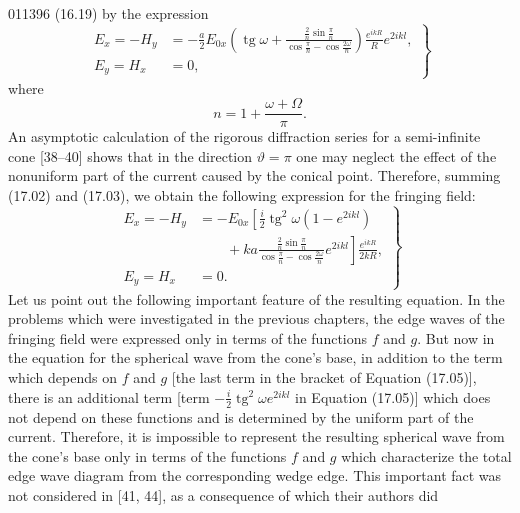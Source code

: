 \begin{scanpage}{0113}{96}
(16.19) by the expression
\[\left.\begin{aligned}E_x=-H_y&=-\frac a2E_{0x}\left(\operatorname{tg}\omega+\frac{\frac2n\sin\frac\pi n}{\cos\frac\pi n-\cos\frac{2\omega}n}\right)\frac{e^{ikR}}R e^{2ikl},\\E_y=H_x&=0,
\end{aligned}\right\}\tag{17.03}\]
where
\[n=1+\frac{\omega+\Omega}\pi.\tag{17.04}\]
An asymptotic calculation of the rigorous diffraction series for a semi-infinite cone [38--40] shows that in the direction $\vartheta=\pi$ one may neglect the effect of the nonuniform part of the current caused by the conical point. Therefore, summing (17.02) and (17.03), we obtain the following expression for the fringing field:
\[\left.\begin{aligned}E_x=-H_y&=-E_{0x}\left[\frac i2\operatorname{tg}^2\omega(1-e^{2ikl})\right.\\&\left.\qquad+ka\frac{\frac2n\sin\frac\pi n}{\cos\frac\pi n-\cos\frac{2\omega}n}e^{2ikl}\right]\frac{e^{ikR}}{2kR},\\E_y=H_x&=0.
\end{aligned}\right\}\tag{17.05}\]
Let us point out the following important feature of the resulting equation. In the problems which were investigated in the previous chapters, the edge waves of the fringing field were expressed only in terms of the functions $f$ and $g$. But now in the equation for the spherical wave from the cone's base, in addition to the term which depends on $f$ and $g$ [the last term in the bracket of Equation (17.05)], there is an additional term [term $-\frac i2\operatorname{tg}^2\omega e^{2ikl}$ in Equation (17.05)] which does not depend on these functions and is determined by the uniform part of the current. Therefore, it is impossible to represent the resulting spherical wave from the cone's base only in terms of the functions $f$ and $g$ which characterize the total edge wave diagram from the corresponding wedge edge. This important fact was not considered in [41, 44], as a consequence of which their authors did
\end{scanpage}
